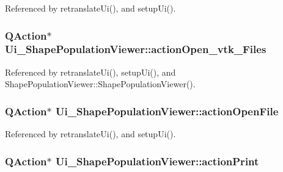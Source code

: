 Referenced by retranslate\-Ui(), and setup\-Ui().

\hypertarget{class_ui___shape_population_viewer_a3fed0dc43d988ee2f0a88bd5f41e2f8d}{
\subsubsection[{action\-Open\-\_\-vtk\-\_\-\-Files}]{\setlength{\rightskip}{0pt plus 5cm}Q\-Action$\ast$ Ui\-\_\-\-Shape\-Population\-Viewer\-::action\-Open\-\_\-vtk\-\_\-\-Files}}\label{class_ui___shape_population_viewer_a3fed0dc43d988ee2f0a88bd5f41e2f8d}


Referenced by retranslate\-Ui(), setup\-Ui(), and Shape\-Population\-Viewer\-::\-Shape\-Population\-Viewer().

\hypertarget{class_ui___shape_population_viewer_a58f4923d6705e47a569ccdaa1ba950ce}{
\subsubsection[{action\-Open\-File}]{\setlength{\rightskip}{0pt plus 5cm}Q\-Action$\ast$ Ui\-\_\-\-Shape\-Population\-Viewer\-::action\-Open\-File}}\label{class_ui___shape_population_viewer_a58f4923d6705e47a569ccdaa1ba950ce}


Referenced by retranslate\-Ui(), and setup\-Ui().

\hypertarget{class_ui___shape_population_viewer_a9ac409dda64e917fe1488ee100820b80}{
\subsubsection[{action\-Print}]{\setlength{\rightskip}{0pt plus 5cm}Q\-Action$\ast$ Ui\-\_\-\-Shape\-Population\-Viewer\-::action\-Print}}\label{class_ui___shape_population_viewer_a9ac409dda64e917fe1488ee100820b80}


